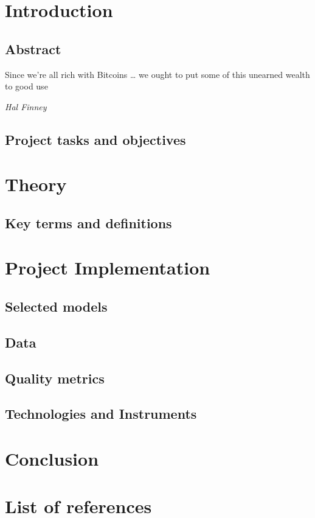 \documentclass{article}
\begin{document}

  
\tableofcontents
\newpage
\section{Introduction} 
\subsection{Abstract}
\epigraph{Since we’re all rich with Bitcoins … we ought to put some of this unearned wealth to good use}{\textit{Hal Finney}}

\subsection{Project tasks and objectives}

\section{Theory}
\subsection{Key terms and definitions}


\section{Project Implementation}
\subsection{Selected models}

\subsection{Data}

\subsection{Quality metrics}

\subsection{Technologies and Instruments}

\section{Conclusion}

\section{List of references}



\end{document}
